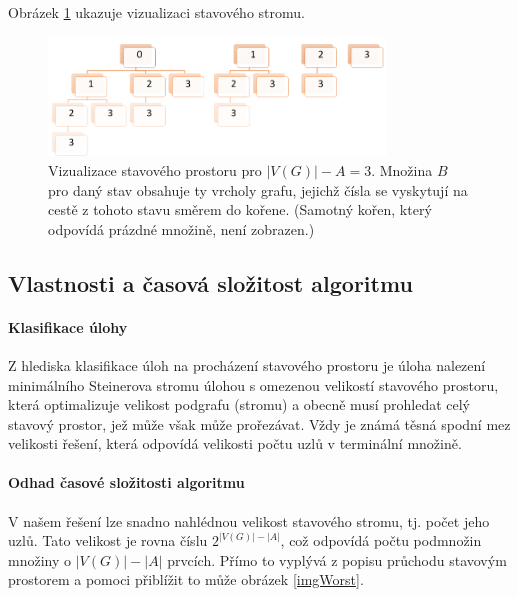 \documentclass[12pt]{article}
\theoremstyle{definition}
\begin{document}
Obrázek \ref{imgStavy} ukazuje vizualizaci stavového stromu.
\begin{figure}[ht]
	\centering
	\includegraphics[width=0.8\textwidth]{obr/stavy.png}
	\caption{Vizualizace stavového prostoru pro $|V(G)|-A=3$. Množina $B$ pro daný stav obsahuje ty vrcholy grafu, jejichž čísla
		se vyskytují na cestě z tohoto stavu směrem do kořene. (Samotný kořen, který odpovídá prázdné množině, není zobrazen.)}
	\label{imgStavy}
\end{figure}
\subsection{Vlastnosti a časová složitost algoritmu}
\paragraph{Klasifikace úlohy}\mbox{}\newline
Z hlediska klasifikace úloh na procházení stavového prostoru je úloha nalezení minimálního
Steinerova stromu úlohou s omezenou velikostí stavového prostoru, která optimalizuje velikost podgrafu (stromu) a obecně musí prohledat celý stavový prostor, jež může však může prořezávat. Vždy je známá těsná spodní mez velikosti řešení, která odpovídá velikosti počtu uzlů v terminální množině.

\paragraph{Odhad časové složitosti algoritmu}\mbox{}\newline
V našem řešení lze snadno nahlédnou velikost stavového stromu, tj. počet jeho uzlů.
Tato velikost je rovna číslu $2^{|V(G)|-|A|}$, což odpovídá počtu podmnožin množiny o 
$|V(G)|-|A|$ prvcích. Přímo to vyplývá z popisu průchodu stavovým prostorem a pomoci přiblížit to může obrázek \ref{imgWorst}.
\end{document}
